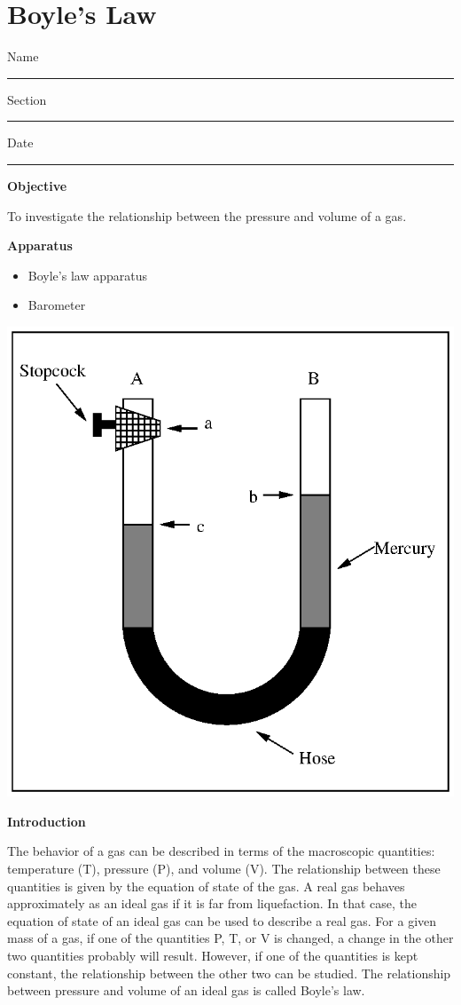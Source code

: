 
\section{Boyle's Law}

Name \rule{2.0in}{0.1pt}\hfill{}Section \rule{1.0in}{0.1pt}\hfill{}Date
\rule{1.0in}{0.1pt}

\textbf{Objective}

To investigate the relationship between the pressure and volume of
a gas.

\textbf{Apparatus}

\begin{itemize}
\item Boyle's law apparatus
\item Barometer
\end{itemize}
\vspace{0.3cm}
{\centering \includegraphics{boyles_law_fig_1.eps} \par}
\vspace{0.3cm}

\textbf{Introduction}

The behavior of a gas can be described in terms of the macroscopic
quantities: temperature (T), pressure (P), and volume (V). The relationship
between these quantities is given by the equation of state of the
gas. A real gas behaves approximately as an ideal gas if it is far
from liquefaction. In that case, the equation of state of an ideal
gas can be used to describe a real gas. For a given mass of a gas,
if one of the quantities P, T, or V is changed, a change in the other
two quantities probably will result. However, if one of the quantities
is kept constant, the relationship between the other two can be studied.
The relationship between pressure and volume of an ideal gas is called
Boyle's law.

